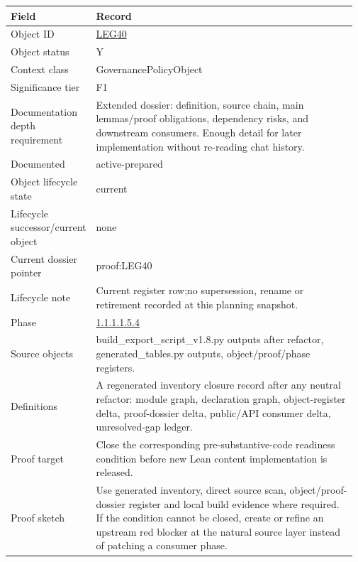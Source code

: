 \begin{longtable}{L{0.16\linewidth} L{0.81\linewidth}}
\hline
\textbf{Field} & \textbf{Record}\\
\hline
Object ID & \hyperlink{object-row-LEG40}{LEG40}\\
\hline\addlinespace[0.20em]
Object status & Y\\
\hline\addlinespace[0.20em]
Context class & GovernancePolicyObject\\
\hline\addlinespace[0.20em]
Significance tier & F1\\
\hline\addlinespace[0.20em]
Documentation depth requirement & Extended dossier: definition, source chain, main lemmas/\allowbreak{}proof obligations, dependency risks, and downstream consumers. Enough detail for later implementation without re-reading chat history.\\
\hline\addlinespace[0.20em]
Documented & active-prepared\\
\hline\addlinespace[0.20em]
Object lifecycle state & current\\
\hline\addlinespace[0.20em]
Lifecycle successor/\allowbreak{}current object & none\\
\hline\addlinespace[0.20em]
Current dossier pointer & proof:LEG40\\
\hline\addlinespace[0.20em]
Lifecycle note & Current register row;\newline no supersession, rename or retirement recorded at this planning snapshot.\\
\hline\addlinespace[0.20em]
Phase & \hyperlink{phase-row-1-1-1-1-5-4}{1.1.1.1.5.4}\\
\hline\addlinespace[0.20em]
Source objects & build\_export\_script\_v1.8.py outputs after refactor, generated\_tables.py outputs, object/\allowbreak{}proof/\allowbreak{}phase registers.\\
\hline\addlinespace[0.20em]
Definitions & A regenerated inventory closure record after any neutral refactor: module graph, declaration graph, object-register delta, proof-dossier delta, public/\allowbreak{}API consumer delta, unresolved-gap ledger.\\
\hline\addlinespace[0.20em]
Proof target & Close the corresponding pre-substantive-code readiness condition before new Lean content implementation is released.\\
\hline\addlinespace[0.20em]
Proof sketch & Use generated inventory, direct source scan, object/\allowbreak{}proof-dossier register and local build evidence where required. If the condition cannot be closed, create or refine an upstream red blocker at the natural source layer instead of patching a consumer phase.\\

\end{longtable}
